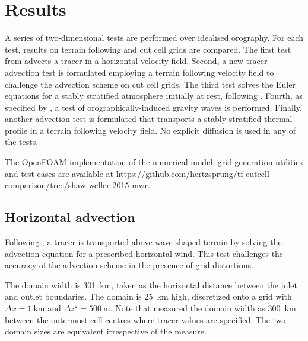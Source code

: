 \documentclass{ametsoc}
\begin{document}


\section{Results}
\label{sec:results}

A series of two-dimensional tests are performed over idealised orography.  For each test, results on terrain following and cut cell grids are compared.  The first test from \citet{schaer2002} advects a tracer in a horizontal velocity field.  Second, a new tracer advection test is formulated employing a terrain following velocity field to challenge the advection scheme on cut cell grids.  The third test solves the Euler equations for a stably stratified atmosphere initially at rest, following \citet{klemp2011}.  Fourth, as specified by \citet{schaer2002}, a test of orographically-induced gravity waves is performed.  Finally, another advection test is formulated that transports a stably stratified thermal profile in a terrain following velocity field.
No explicit diffusion is used in any of the tests.

The OpenFOAM implementation of the numerical model, grid generation utilities and test cases are available at \url{https://github.com/hertzsprung/tf-cutcell-comparison/tree/shaw-weller-2015-mwr}.


\subsection{Horizontal advection}

Following \citet{schaer2002}, a tracer is transported above wave-shaped terrain by solving the advection equation for a prescribed horizontal wind.  This test challenges the accuracy of the advection scheme in the presence of grid distortions.

The domain width is \SI{301}{\kilo\meter}, taken as the horizontal distance between the inlet and outlet boundaries.  The domain is \SI{25}{\kilo\meter} high, discretized onto a grid with \(\Delta x = \SI{1}{\kilo\meter}\) and \(\Delta z^\star = \SI{500}{\meter}\).  Note that \citet{schaer2002} measured the domain width as \SI{300}{\kilo\meter} between the outermost cell centres where tracer values are specified.  The two domain sizes are equivalent irrespective of the measure.
\end{document}
